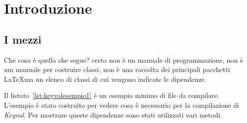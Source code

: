 \chapter{Introduzione}
\section{I mezzi}
\lstset{language=[LaTeX]TeX} 
Che cosa è quello che segue? certo non è un manuale di programmazione, non è um manuale per costruire classi, non è una raccolta dei principali pacchetti \LaTeX ma un elenco di classi di cui vengono indicate le dipendenze.   

 

Il listato~\vref{lst:keyvalesempio1} è un esempio minimo di file da compilare. L'esempio è stato costruito per vedere cosa è necessario per la compilazione di \textit{Keyval}. Per mostrare queste dipendenze sono stati utilizzati vari metodi.

